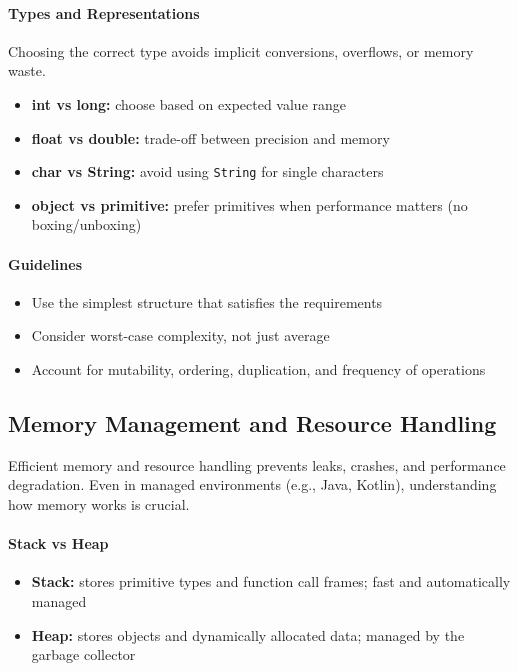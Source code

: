 \documentclass[a4paper,12pt]{article}
\begin{document}
\paragraph{Types and Representations}
Choosing the correct type avoids implicit conversions, overflows, or memory waste.

\begin{itemize}
  \item \textbf{int vs long:} choose based on expected value range
  \item \textbf{float vs double:} trade-off between precision and memory
  \item \textbf{char vs String:} avoid using \texttt{String} for single characters
  \item \textbf{object vs primitive:} prefer primitives when performance matters (no boxing/unboxing)
\end{itemize}

\paragraph{Guidelines}
\begin{itemize}
  \item Use the simplest structure that satisfies the requirements
  \item Consider worst-case complexity, not just average
  \item Account for mutability, ordering, duplication, and frequency of operations
\end{itemize}

\subsection{Memory Management and Resource Handling}

Efficient memory and resource handling prevents leaks, crashes, and performance degradation. Even in managed environments (e.g., Java, Kotlin), understanding how memory works is crucial.

\paragraph{Stack vs Heap}
\begin{itemize}
  \item \textbf{Stack:} stores primitive types and function call frames; fast and automatically managed
  \item \textbf{Heap:} stores objects and dynamically allocated data; managed by the garbage collector
\end{itemize}
\end{document}
